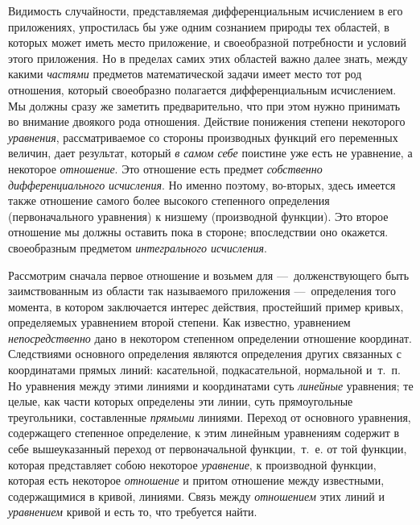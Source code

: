 Видимость случайности, представляемая дифференциальным исчислением в его
приложениях, упростилась бы уже одним сознанием природы тех областей, в
которых может иметь место приложение, и своеобразной потребности и условий
этого приложения. Но в пределах самих этих областей важно далее знать,
между какими {\em частями} предметов математической
задачи имеет место тот род отношения, который своеобразно полагается
дифференциальным исчислением. Мы должны сразу же заметить предварительно,
что при этом нужно принимать во внимание двоякого рода отношения. Действие
понижения степени некоторого {\em уравнения},
рассматриваемое со стороны производных функций его переменных величин, дает
результат, который {\em в самом себе} поистине уже есть
не уравнение, а некоторое {\em отношение}. Это
отношение есть предмет {\em собственно
дифференциального} {\em исчисления}. Но именно поэтому,
во-вторых, здесь имеется также отношение самого более высокого степенного
определения (первоначального уравнения) к низшему (производной функции).
Это второе отношение мы должны оставить пока в стороне; впоследствии оно
окажется. своеобразным предметом {\em интегрального
исчисления}.

Рассмотрим сначала первое отношение и возьмем для —~долженствующего быть
заимствованным из области так называемого приложения —~определения того
момента, в котором заключается интерес действия, простейший пример кривых,
определяемых уравнением второй степени. Как известно, уравнением
{\em непосредственно} дано в некотором степенном
определении отношение координат. Следствиями основного определения являются
определения других связанных с координатами прямых линий: касательной,
подкасательной, нормальной и~т.~п. Но уравнения между этими линиями и
координатами суть {\em линейные} уравнения; те целые,
как части которых определены эти линии, суть прямоугольные треугольники,
составленные {\em прямыми} линиями. Переход от
основного уравнения, содержащего степенное определение, к этим линейным
уравнениям содержит в себе вышеуказанный переход от первоначальной
функции,~т.~е. от той функции, которая представляет собою некоторое
{\em уравнение}, к производной функции, которая есть
некоторое {\em отношение} и притом отношение между
известными, содержащимися в кривой, линиями. Связь между
{\em отношением} этих линий и
{\em уравнением} кривой и есть то, что требуется найти.

